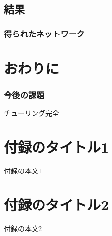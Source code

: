 \documentclass[exploratorypaper]{jsaiart} %
\begin{document}
\subsection{結果}
\subsubsection{得られたネットワーク}
\section{おわりに}
\subsubsection{今後の課題}
チューリング完全




\appendix

\section{付録のタイトル1}

付録の本文1

\section{付録のタイトル2}

付録の本文2

\begin{biography}
\end{biography}
\end{document}
